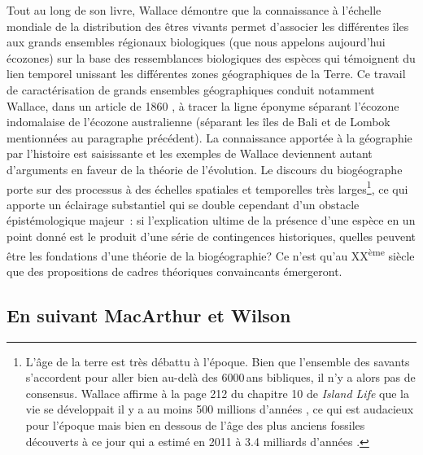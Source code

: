 Tout au long de son livre, Wallace démontre que la connaissance à
l'échelle mondiale de la distribution des êtres vivants permet
d'associer les différentes îles aux grands ensembles régionaux
biologiques (que nous appelons aujourd'hui écozones) sur la base des
ressemblances biologiques des espèces qui témoignent du lien temporel
unissant les différentes zones géographiques de la Terre. Ce travail de
caractérisation de grands ensembles géographiques conduit notamment
Wallace, dans un article de 1860 \citep{Wallace1860}, à tracer la ligne
éponyme séparant l'écozone indomalaise de l'écozone australienne
(séparant les îles de Bali et de Lombok mentionnées au paragraphe
précédent). La connaissance apportée à la géographie par l'histoire est
saisissante et les exemples de Wallace deviennent autant d'arguments en
faveur de la théorie de l'évolution. Le discours du biogéographe porte
sur des processus à des échelles spatiales et temporelles très
larges\footnote{L'âge de la terre est très débattu à l'époque. Bien que
  l'ensemble des savants s'accordent pour aller bien au-delà des
  6000 ans bibliques, il n'y a alors pas de consensus. Wallace affirme à
  la page 212 du chapitre 10 de \emph{Island Life} que la vie se
  développait il y a au moins 500 millions d'années
  \citep{wallace1881island}, ce qui est audacieux pour l'époque mais
  bien en dessous de l'âge des plus anciens fossiles découverts à ce
  jour qui a estimé en 2011 à 3.4 milliards d'années \citep{Wacey2011}.},
ce qui apporte un éclairage substantiel qui se double cependant d'un
obstacle épistémologique majeur~: si l'explication ultime de la présence
d'une espèce en un point donné est le produit d'une série de
contingences historiques, quelles peuvent être les fondations d'une
théorie de la biogéographie? Ce n'est qu'au XX\textsuperscript{ème}
siècle que des propositions de cadres théoriques convaincants
émergeront.

\subsection*{En suivant MacArthur et
Wilson}\label{en-suivant-macarthur-et-wilson}

